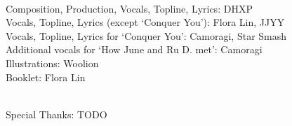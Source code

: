 \documentclass{article}
\begin{document}
\phantom{*}\\
Composition, Production, Vocals, Topline, Lyrics: DHXP\\
Vocals, Topline, Lyrics (except `Conquer You'): Flora Lin, JJYY\\
Vocals, Topline, Lyrics for `Conquer You': Camoragi, Star Smash\\
Additional vocals for `How June and Ru D. met': Camoragi\\
Illustrations: Woolion\\
Booklet: Flora Lin

\phantom{*}\\
Special Thanks: TODO
\end{document}
